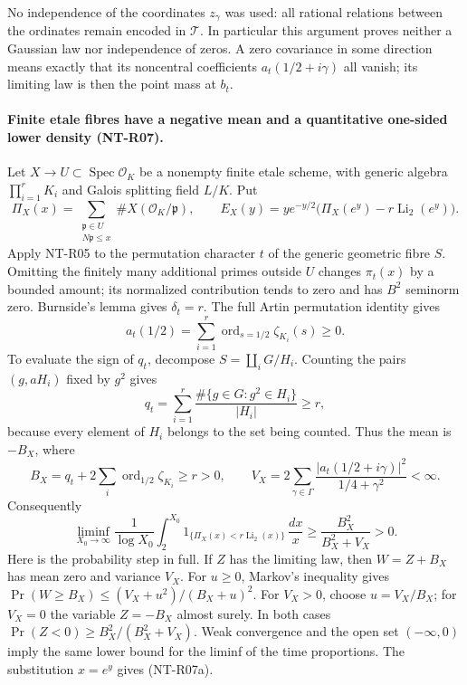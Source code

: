 \documentclass[11pt,a4paper]{article}
\begin{document}
No independence of the coordinates $z_\gamma$ was used: all rational
relations between the ordinates remain encoded in $\mathcal T$.
In particular this argument proves neither a Gaussian law nor
independence of zeros. A zero covariance in some direction means
exactly that its noncentral coefficients $a_t(1/2+i\gamma)$ all
vanish; its limiting law is then the point mass at $b_t$.

\paragraph{Finite etale fibres have a negative mean and a quantitative
one-sided lower density (NT-R07).}
Let $X\to U\subset\operatorname{Spec}\mathcal O_K$ be a nonempty
finite etale scheme, with generic algebra $\prod_{i=1}^r K_i$ and
Galois splitting field $L/K$. Put
\[
 \Pi_X(x)=\sum_{\substack{\mathfrak p\in U\\N\mathfrak p\le x}}
                         \#X(\mathcal O_K/\mathfrak p),\qquad
 E_X(y)=ye^{-y/2}\bigl(\Pi_X(e^y)-r\operatorname{Li}_2(e^y)\bigr).
\]
Apply NT-R05 to the permutation character $t$ of the generic
geometric fibre $S$. Omitting the finitely many additional primes
outside $U$ changes $\pi_t(x)$ by a bounded amount; its normalized
contribution tends to zero and has $B^2$ seminorm zero. Burnside's
lemma gives $\delta_t=r$. The full Artin permutation identity gives
\[
 a_t(1/2)=\sum_{i=1}^r\operatorname{ord}_{s=1/2}\zeta_{K_i}(s)
       \ge0.
\]
To evaluate the sign of $q_t$, decompose $S=\coprod_iG/H_i$.
Counting the pairs $(g,aH_i)$ fixed by $g^2$ gives
\[
 q_t=\sum_{i=1}^r
      \frac{\#\{g\in G:g^2\in H_i\}}{|H_i|}\ge r,
\]
because every element of $H_i$ belongs to the set being counted.
Thus the mean is $-B_X$, where
\[
 B_X=q_t+2\sum_i\operatorname{ord}_{1/2}\zeta_{K_i}\ge r>0,
 \qquad
 V_X=2\sum_{\gamma\in\Gamma}
          \frac{|a_t(1/2+i\gamma)|^2}{1/4+\gamma^2}<\infty.
\]
Consequently
\[
 \liminf_{X_0\to\infty}\frac1{\log X_0}
 \int_2^{X_0}
 1_{\{\Pi_X(x)<r\operatorname{Li}_2(x)\}}\,\frac{dx}{x}
       \ge\frac{B_X^2}{B_X^2+V_X}>0.
 \tag{NT-R07a}
\]
Here is the probability step in full. If $Z$ has the limiting law,
then $W=Z+B_X$ has mean zero and variance $V_X$. For $u\ge0$,
Markov's inequality gives
$\Pr(W\ge B_X)\le(V_X+u^2)/(B_X+u)^2$.
For $V_X>0$, choose $u=V_X/B_X$; for $V_X=0$ the variable
$Z=-B_X$ almost surely. In both cases
$\Pr(Z<0)\ge B_X^2/(B_X^2+V_X)$.
Weak convergence and the open set $(-\infty,0)$ imply the same
lower bound for the liminf of the time proportions. The substitution
$x=e^y$ gives (NT-R07a).
\end{document}
